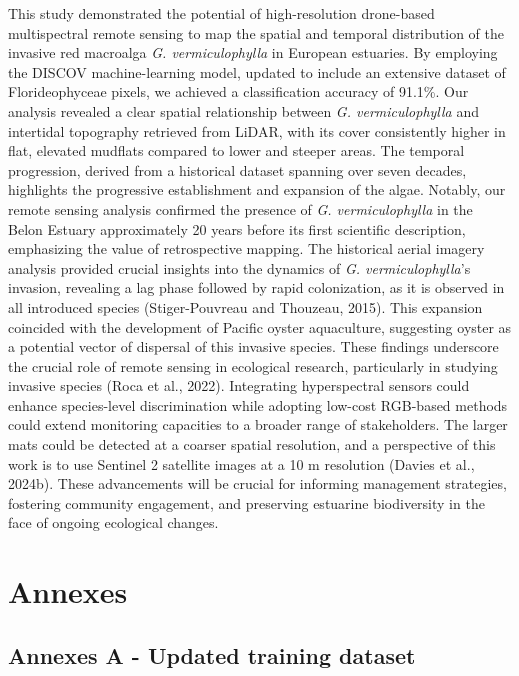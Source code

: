 \documentclass[
  letterpaper,
  DIV=11,
  numbers=noendperiod]{scrartcl}
\begin{document}
This study demonstrated the potential of high-resolution drone-based
multispectral remote sensing to map the spatial and temporal
distribution of the invasive red macroalga \emph{G. vermiculophylla} in
European estuaries. By employing the DISCOV machine-learning model,
updated to include an extensive dataset of Florideophyceae pixels, we
achieved a classification accuracy of 91.1\%. Our analysis revealed a
clear spatial relationship between \emph{G. vermiculophylla} and
intertidal topography retrieved from LiDAR, with its cover consistently
higher in flat, elevated mudflats compared to lower and steeper areas.
The temporal progression, derived from a historical dataset spanning
over seven decades, highlights the progressive establishment and
expansion of the algae. Notably, our remote sensing analysis confirmed
the presence of \emph{G. vermiculophylla} in the Belon Estuary
approximately 20 years before its first scientific description,
emphasizing the value of retrospective mapping. The historical aerial
imagery analysis provided crucial insights into the dynamics of \emph{G.
vermiculophylla}'s invasion, revealing a lag phase followed by rapid
colonization, as it is observed in all introduced species
(Stiger-Pouvreau and Thouzeau, 2015). This expansion coincided with the
development of Pacific oyster aquaculture, suggesting oyster as a
potential vector of dispersal of this invasive species. These findings
underscore the crucial role of remote sensing in ecological research,
particularly in studying invasive species (Roca et al., 2022).
Integrating hyperspectral sensors could enhance species-level
discrimination while adopting low-cost RGB-based methods could extend
monitoring capacities to a broader range of stakeholders. The larger
mats could be detected at a coarser spatial resolution, and a
perspective of this work is to use Sentinel 2 satellite images at a 10 m
resolution (Davies et al., 2024b). These advancements will be crucial
for informing management strategies, fostering community engagement, and
preserving estuarine biodiversity in the face of ongoing ecological
changes.

\newpage

\section{Annexes}\label{annexes}

\subsection{Annexes A - Updated training dataset}\label{sec-AnnexeA}
\end{document}
